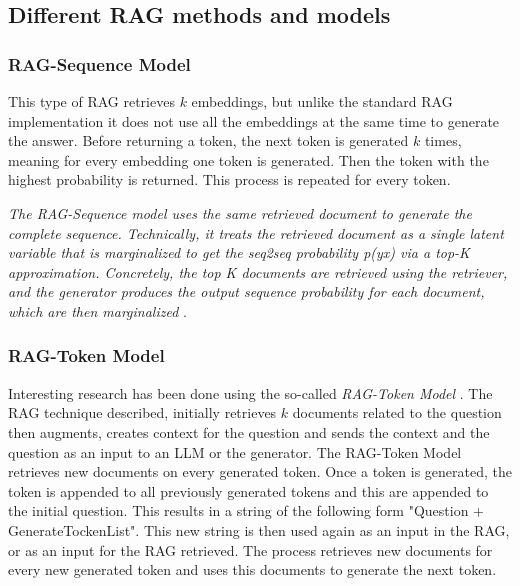 \documentclass{wseas}
\begin{document}
\subsection{Different RAG methods and
models}

\subsubsection{RAG-Sequence Model}

This type of RAG retrieves \(k\) embeddings, but unlike the standard RAG
implementation it does not use all the embeddings at the same time to
generate the answer. Before returning a token, the next token is
generated \(k\) times, meaning for every embedding one token is
generated. Then the token with the highest probability is returned. This 
process is repeated for every token.

\emph{The RAG-Sequence model uses the same retrieved document to
generate the complete sequence. Technically, it treats the retrieved
document as a single latent variable that is marginalized to get the
seq2seq probability p(y\textbar x) via a top-K approximation.
Concretely, the top K documents are retrieved using the retriever, and
the generator produces the output sequence probability for each
document, which are then marginalized} \cite{Retrieval_Augmented_Generation_(RAG)_Explained_Understanding_Key_Concepts}.

\subsubsection{RAG-Token Model}

Interesting research has been done using the so-called \emph{RAG-Token
Model} \cite{Retrieval_Augmented_Generation_(RAG)_Explained_Understanding_Key_Concepts}. The RAG technique described, initially retrieves \(k\) documents
related to the question then augments, creates context for the question and
sends the context and the question as an input to an LLM or the
generator. The RAG-Token Model retrieves new documents on every
generated token. Once a token is generated, the token is appended to all
previously generated tokens and this are appended to the initial
question. This results in a string of the following form "Question +
GenerateTockenList". This new string is then used again as an input in
the RAG, or as an input for the RAG retrieved. The process retrieves new
documents for every new generated token and uses this documents to
generate the next token. 
\end{document}
